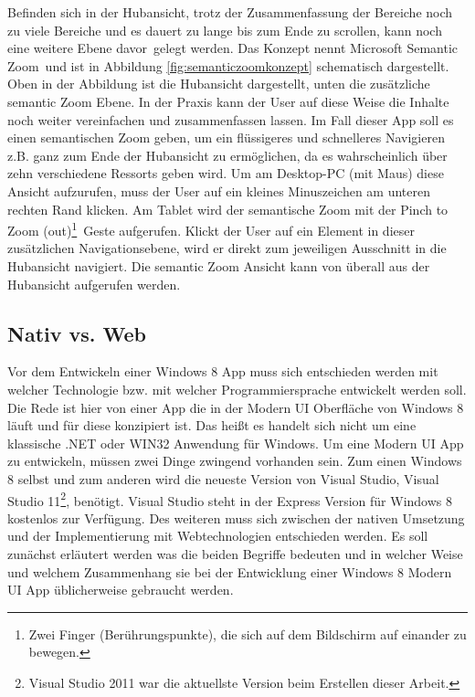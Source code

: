 \documentclass[12pt,a4paper,bibtotoc,abstracton]{scrartcl}
\begin{document}
Befinden sich in der Hubansicht, trotz der Zusammenfassung der Bereiche noch zu viele Bereiche und es dauert zu lange bis zum Ende zu scrollen, kann noch eine weitere Ebene \glqq davor\grqq\ gelegt werden. Das Konzept nennt Microsoft \glqq Semantic Zoom\grqq\ und ist in Abbildung \ref{fig:semanticzoomkonzept} schematisch dargestellt. Oben in der Abbildung ist die Hubansicht dargestellt, unten die zusätzliche semantic Zoom Ebene. In der Praxis kann der User auf diese Weise die Inhalte noch weiter vereinfachen und zusammenfassen lassen. Im Fall dieser App soll es einen semantischen Zoom geben, um ein flüssigeres und schnelleres Navigieren z.B. ganz zum Ende der Hubansicht zu ermöglichen, da es wahrscheinlich über zehn verschiedene Ressorts geben wird. Um am Desktop-PC (mit Maus) diese Ansicht aufzurufen, muss der User auf ein kleines Minuszeichen am unteren rechten Rand klicken. Am Tablet wird der semantische Zoom mit der \glqq Pinch to Zoom (out)\footnote{Zwei Finger (Berührungspunkte), die sich auf dem Bildschirm auf einander zu bewegen.}\grqq\  Geste aufgerufen. Klickt der User auf ein Element in dieser zusätzlichen Navigationsebene, wird er direkt zum jeweiligen Ausschnitt in die Hubansicht navigiert. Die semantic Zoom Ansicht kann von überall aus der Hubansicht aufgerufen werden.  


\subsection{Nativ vs. Web}
\label{subsec:nativ_vs_web}
Vor dem Entwickeln einer Windows 8 App muss sich entschieden werden mit welcher Technologie bzw. mit welcher Programmiersprache entwickelt werden soll. Die Rede ist hier von einer App die in der Modern UI Oberfläche von Windows 8 läuft und für diese konzipiert ist. Das heißt es handelt sich nicht um eine klassische .NET oder WIN32 Anwendung für Windows. Um eine Modern UI App zu entwickeln, müssen zwei Dinge zwingend vorhanden sein. Zum einen Windows 8 selbst und zum anderen wird die neueste Version von Visual Studio, Visual Studio 11\footnote{Visual Studio 2011 war die aktuellste Version beim Erstellen dieser Arbeit.}, benötigt. Visual Studio steht in der Express Version für Windows 8 kostenlos zur Verfügung. Des weiteren muss sich zwischen der nativen Umsetzung und der Implementierung mit Webtechnologien entschieden werden. Es soll zunächst erläutert werden was die beiden Begriffe bedeuten und in welcher Weise und welchem Zusammenhang sie bei der Entwicklung einer Windows 8 Modern UI App üblicherweise gebraucht werden.
\end{document}
